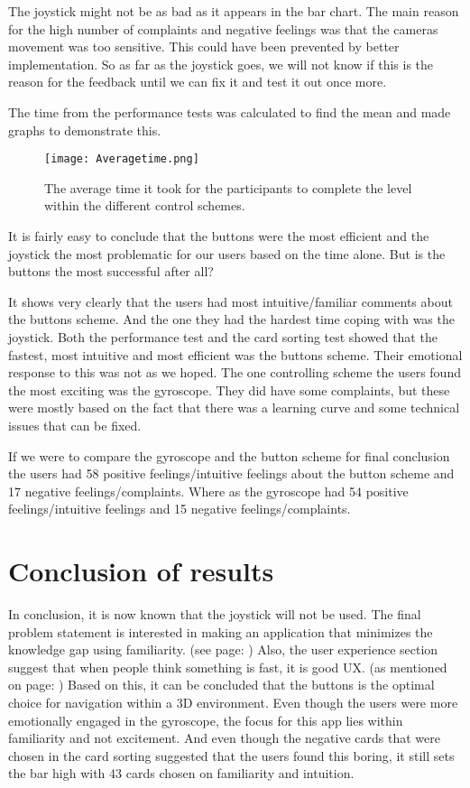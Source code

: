 The joystick might not be as bad as it appears in the bar chart. The main reason for the high number of complaints and negative feelings was that the cameras movement was too sensitive. This could have been prevented by better implementation. So as far as the joystick goes, we will not know if this is the reason for the feedback until we can fix it and test it out once more.


The time from the performance tests was calculated to find the mean and made graphs to demonstrate this. 

\begin{figure}[H]
\centering
\texttt{[image: Averagetime.png]}
\caption{The average time it took for the participants to complete the level within the different control schemes.}
\end{figure}

It is fairly easy to conclude that the buttons were the most efficient and the joystick the most problematic for our users based on the time alone. But is the buttons the most successful after all?

It shows very clearly that the users had most intuitive/familiar comments about the buttons scheme. And the one they had the hardest time coping with was the joystick. 
Both the performance test and the card sorting test showed that the fastest, most intuitive and most efficient was the buttons scheme. Their emotional response to this was not as we hoped. 
The one controlling scheme the users found the most exciting was the gyroscope. They did have some complaints, but these were mostly based on the fact that there was a learning curve and some technical issues that can be fixed. 

If we were to compare the gyroscope and the button scheme for final conclusion the users had 58 positive feelings/intuitive feelings about the button scheme and 17 negative feelings/complaints. Where as the gyroscope had 54 positive feelings/intuitive feelings and 15 negative feelings/complaints. 

\section{Conclusion of results}

In conclusion, it is now known that the joystick will not be used. 
The final problem statement is interested in making an application that minimizes the knowledge gap using familiarity. (see page: \pageref{FPS})
Also, the user experience section suggest that when people think something is fast, it is good UX. (as mentioned on page: \pageref{EvalConFast}) 
Based on this, it can be concluded that the buttons is the optimal choice for navigation within a 3D environment. Even though the users were more emotionally engaged in the gyroscope, the focus for this app lies within familiarity and not excitement. And even though the negative cards that were chosen in the card sorting suggested that the users found this boring, it still sets the bar high with 43 cards chosen on familiarity and intuition.
 


